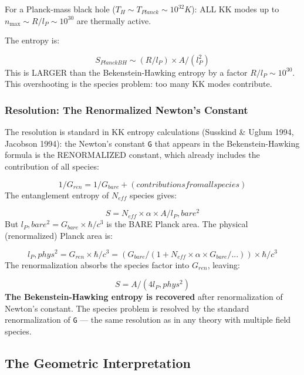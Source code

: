\documentclass[aps,prd,preprint,superscriptaddress,longbibliography,floatfix]{revtex4-2}
\theoremstyle{remark}
\begin{document}
For a Planck-mass black hole ($T_H \sim  T_{Planck} \sim  10^{32} K$): ALL KK modes up to $n_{\max} \sim  R/l_P \sim  10^{30}$ are thermally active.

The entropy is:


\begin{equation}
    S_{Planck BH} \sim  (R/l_P) \times A/(l_P^{2})
\end{equation}
This is LARGER than the Bekenstein-Hawking entropy by a factor $R/l_P \sim  10^{30}$. This overshooting is the species problem: too many KK modes contribute.


\subsubsection{Resolution: The Renormalized Newton's Constant}

The resolution is standard in KK entropy calculations (Susskind \& Uglum 1994, Jacobson 1994): the Newton's constant \texttt{G} that appears in the Bekenstein-Hawking formula is the RENORMALIZED constant, which already includes the contribution of all species:


\begin{equation}
    1/G_{ren} = 1/G_{bare} + (contributions from all species)
\end{equation}
The entanglement entropy of $N_{eff}$ species gives:


\begin{equation}
    S = N_{eff} \times \alpha \times A/l_P,bare^{2}
\end{equation}
But $l_P,bare^{2} = G_{bare} \times \hbar/c^{3}$ is the BARE Planck area. The physical (renormalized) Planck area is:


\begin{equation}
    l_P,phys^{2} = G_{ren} \times \hbar/c^{3} = (G_{bare}/(1 + N_{eff} \times \alpha \times G_{bare}/...)) \times \hbar/c^{3}
\end{equation}
The renormalization absorbs the species factor into $G_{ren}$, leaving:


\begin{equation}
    S = A/(4 l_P,phys^{2})
\end{equation}
\textbf{The Bekenstein-Hawking entropy is recovered} after renormalization of Newton's constant. The species problem is resolved by the standard renormalization of \texttt{G} --- the same resolution as in any theory with multiple field species.



\subsection{The Geometric Interpretation}
\end{document}
